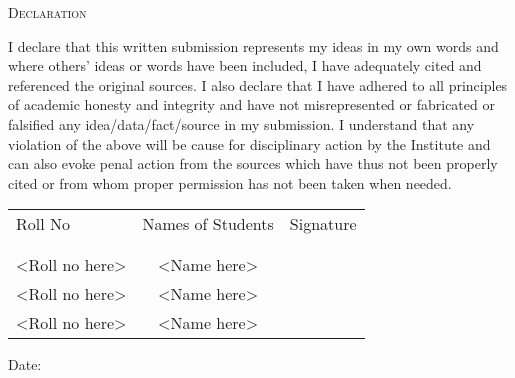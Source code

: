 \newpage
\thispagestyle{empty}

\begin{center}
    \Large \textsc {Declaration}\\[0.5cm]
\end{center}

\normalsize I declare that this written submission represents my ideas in my own words and
where others' ideas or words have been included, I have adequately cited and
referenced the original sources. I also declare that I have adhered to all principles
of academic honesty and integrity and have not misrepresented or fabricated or
falsified any idea/data/fact/source in my submission. I understand that any
violation of the above will be cause for disciplinary action by the Institute and can
also evoke penal action from the sources which have thus not been properly cited
or from whom proper permission has not been taken when needed.

\vspace{.4in}
\begin{table}[h]
    \centering
    \begin{tabular}{lcr}
        Roll No        & Names of Students & Signature \\ \\ \hline
        \\
        <Roll no here> & <Name here>       &           \\
        <Roll no here> & <Name here>       &           \\
        <Roll no here> & <Name here>       &           \\
    \end{tabular}
\end{table}

\vspace{.4in}
\begin{flushleft}
    Date:
\end{flushleft}
